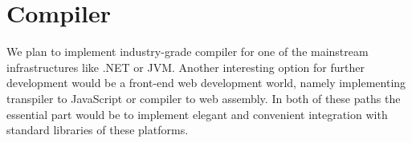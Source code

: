 \documentclass[declaration,shortabstract,english]{iithesis}
\begin{document}
\section{Compiler}
We plan to implement industry-grade compiler for one of the mainstream infrastructures like .NET or JVM.
Another interesting option for further development would be a front-end web development world,
namely implementing transpiler to JavaScript or compiler to web assembly.
In both of these paths the essential part would be to implement elegant and convenient integration
with standard libraries of these platforms.




\end{document}

